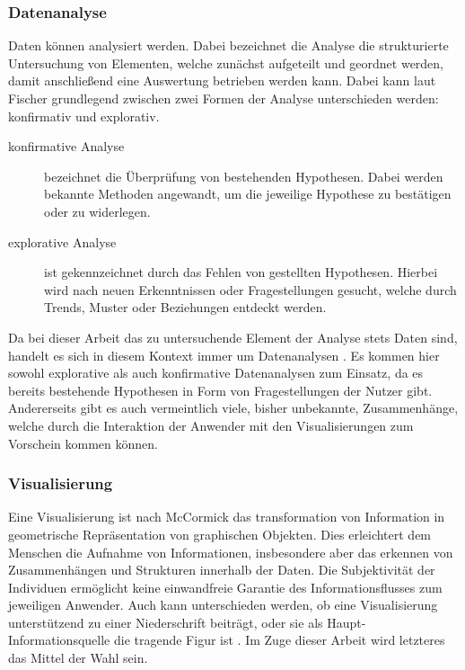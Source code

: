 \subsubsection{Datenanalyse}
Daten können analysiert werden.
Dabei bezeichnet die Analyse die strukturierte Untersuchung von Elementen, welche zunächst aufgeteilt und geordnet werden, damit anschließend eine Auswertung betrieben werden kann.
Dabei kann laut Fischer \cite{Fischer.2014} grundlegend zwischen zwei Formen der Analyse unterschieden werden: konfirmativ und explorativ.
\begin{description}
\item[konfirmative Analyse] bezeichnet die Überprüfung von bestehenden Hypothesen.
Dabei werden bekannte Methoden angewandt, um die jeweilige Hypothese zu bestätigen oder zu widerlegen.
\item[explorative Analyse] ist gekennzeichnet durch das Fehlen von gestellten Hypothesen.
Hierbei wird nach neuen Erkenntnissen oder Fragestellungen gesucht, welche durch Trends, Muster oder Beziehungen entdeckt werden.
\end{description}

Da bei dieser Arbeit das zu untersuchende Element der Analyse stets Daten sind, handelt es sich in diesem Kontext immer um \glqq Datenanalysen\grqq{} \cite{Schumann.2000}.
Es kommen hier sowohl explorative als auch konfirmative Datenanalysen zum Einsatz, da es bereits bestehende Hypothesen in Form von Fragestellungen der Nutzer gibt.
Andererseits gibt es auch vermeintlich viele, bisher unbekannte, Zusammenhänge, welche durch die Interaktion der Anwender mit den Visualisierungen zum Vorschein kommen können.


\subsubsection{Visualisierung}
Eine Visualisierung ist nach McCormick \cite{Mccormick.1987} das transformation von Information in geometrische Repräsentation von graphischen Objekten.
Dies erleichtert dem Menschen die Aufnahme von Informationen, insbesondere aber das erkennen von Zusammenhängen und Strukturen innerhalb der Daten.
Die Subjektivität der Individuen ermöglicht keine einwandfreie Garantie des Informationsflusses zum jeweiligen Anwender. %
Auch kann unterschieden werden, ob eine Visualisierung unterstützend zu einer Niederschrift beiträgt, oder sie als Haupt-Informationsquelle die tragende Figur ist \cite{Bassler.2010}.
Im Zuge dieser Arbeit wird letzteres das Mittel der Wahl sein.

